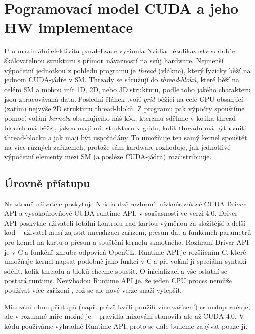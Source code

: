 \section{Pogramovací model CUDA a jeho HW implementace}

    Pro maximální efektivitu paralelizace vyvinula Nvidia několikavrstvou dobře škálovatelnou strukturu s přímou návazností na svůj hardware. Nejmenší výpočetní jednotkou z pohledu programu je \emph{thread} (vlákno), který fyzicky běží na jednom CUDA-jádře v SM. Thready se sdružují do \emph{thread-bloků}, které běží na celém SM a mohou mít 1D, 2D, nebo 3D strukturu, podle toho jakého charakteru jsou zpracovávaná data. Poslední článek tvoří \emph{grid} běžící na celé GPU obsahjící (zatím) nejvýše 2D strukturu thread-bloků. Z programu pak výpočty spouštíme pomocí volání \emph{kernelu} obsahujícího náš kód, kterému sdělíme v kolika thread-blocích má běžet, jakou mají mít strukturu v gridu, kolik threadů má být uvnitř thread-blocku a jak mají být uspořádány. To umožňuje ten samý kernel spouštět na více různých zařízeních, protože sám hardware rozhoduje, jak jednotlivé výpočetní elementy mezi SM (a posléze CUDA-jádra) rozdistribuuje.
    
    \subsection{Úrovně přístupu}
    
    Na straně uživatele poskytuje Nvidia dvě rozhraní: nízkoúrovňové CUDA Driver API a vysokoúrovňové CUDA runtime API, v soušasnosti ve verzi 4.0. Driver API poskytne uživateli totální kontrolu nad kartou výměnou za složitější a delší kód -- uživatel musí zajistit inicializaci zařízení, přesun dat a funkčních parametrů pro kernel na kartu a přesun a spuštění kernelu samotného. Rozhraní Driver API je v C a funkčně zhruba odpovídá OpenCL. Runtime API je rozšířením C, které umožňuje kernel napsat podobně jako funkci v C a při volání jí speciální syntaxí sdělit, kolik threadů a bloků chceme spustit. O inicializaci a vše ostatní se postará runtime. Nevýhodou Runtime API je, že jeden CPU proces nemůže používat více zařízení , což se ale nové verze snaží vylepšit.
    
    Mixování obou přístupů (např. právě kvůli použití více zařízení) se nedoporučuje, ale v rozumné míře možné je -- pravidla mixování stanovila ale až CUDA 4.0. V kódu používáme výhradně Runtime API, proto se dále budeme zabývat pouze jí.
    

